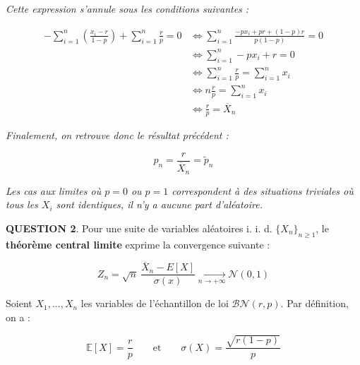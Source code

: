 \documentclass[a4paper,11pt]{article}
\newcommand{\quest}[1]{\small\textbf{#1}\normalsize}
\theoremstyle{nonumberplain}
\theoremstyle{nonumberplain}
\theoremstyle{nonumberplain}
\theoremstyle{nonumberplain}
\begin{document}
\begin{calculs}
        \newpage
        \emph{}\newline
        \emph{Cette expression s'annule sous les conditions suivantes :}

        \vspace{-2ex}
        \begin{equation*}
        \begin{split}
            - \sum\limits_{i = 1}^{n} (\frac{x_i - r}{1 - p}) + \sum\limits_{i = 1}^{n} \frac{r}{p} = 0 & \iff \sum\limits_{i = 1}^{n} \frac{-px_i + pr + (1 - p)r}{p(1-p)} = 0 \\
              & \iff \sum\limits_{i = 1}^{n} -px_i + r = 0 \\
              & \iff \sum\limits_{i = 1}^{n} \frac{r}{p} = \sum\limits_{i = 1}^{n} x_i \\
              & \iff n\frac{r}{p} = \sum\limits_{i = 1}^{n} x_i \\
              & \iff \frac{r}{p} = \overline{X}_n
        \end{split}
        \end{equation*}

        \emph{Finalement, on retrouve donc le résultat précédent :}

        $$\hat{p}_n = \frac{r}{\overline{X}_n} = \tilde{p}_n$$

        \medskip
        \emph{Les cas aux limites où $p = 0$ ou $p = 1$ correspondent
        à des situations triviales où tous les $X_i$ sont identiques, il n'y a aucune part d'aléatoire.}
    \end{calculs}

    \bigskip
    \bigskip
    \quest{QUESTION 2}. Pour une suite de variables aléatoires
    i. i. d. $\{X_n\}_{n \ge 1}$, le \textbf{théorème central limite} exprime la convergence
    suivante :

    \[
        Z_n = \sqrt n\ \frac{\overline{X}_n - E[X]}{\sigma(x)} \xrightarrow[n \rightarrow +\infty]{} \mathcal{N}(0, 1)
    \]

    \bigskip
    Soient $X_1, ..., X_n$ les variables de l'échantillon de loi $\mathcal{BN}(r, p)$. Par définition, on a :

    \[
        \mathbb{E}[X] = \frac{r}{p}\qquad\text{et}\qquad \sigma(X) = \frac{\sqrt{r (1 - p)}}{p}
    \]
\end{document}
